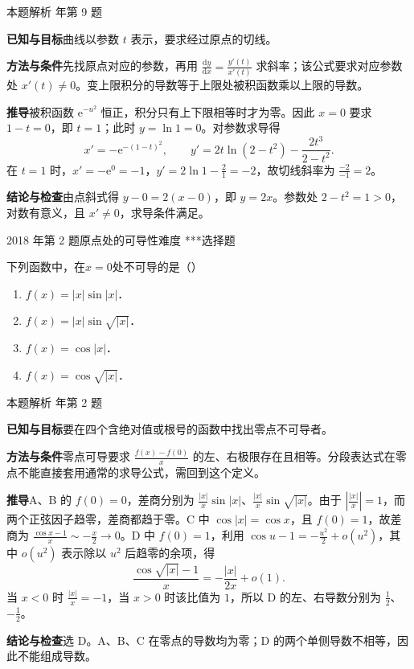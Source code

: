 \documentclass[UTF8,zihao=-4,fontset=fandol]{ctexart}
\newcommand{\pickout}{\hfill（\hspace{1.4em}）}
\newenvironment{abcd}{\begin{enumerate}[label=\textup{(\Alph*)},leftmargin=2.3em,itemsep=1pt,topsep=4pt,parsep=1pt]}{\end{enumerate}}
\newcounter{BankQuestion}
\newcommand{\QuestionPage}[7]{%
  \stepcounter{BankQuestion}%
  \par\noindent\begin{minipage}{\linewidth}
  \raggedright
  {\small\textcolor{black!60}{#3\quad #5\quad 难度 #7}\hfill\textcolor{accent}{#2}}\par\smallskip}
\newcommand{\QuestionEnd}{\end{minipage}\par\medskip}
\newcommand{\QuestionPage}[7]{%
  \clearpage
  \stepcounter{BankQuestion}%
  {\small\textcolor{accent}{#1\hfill #2}}\par\medskip
  {\small\textcolor{black!60}{#3\quad #5\quad 难度 #7\hfill \arabic{BankQuestion} / 234}}\par\vspace{9bp}}
\newcommand{\QuestionEnd}{}
\newenvironment{QuestionSolution}[1]{%
  \clearpage
  {\small\textcolor{black!60}{本题解析\quad #1}}\par\medskip
}{\par\clearpage}
\begin{document}
\begin{QuestionSolution}{2009 年第 9 题}
\textbf{已知与目标}\quad 曲线以参数 \(t\) 表示，要求经过原点的切线。

\textbf{方法与条件}\quad 先找原点对应的参数，再用 \(\frac{\mathrm dy}{\mathrm dx}=\frac{y'(t)}{x'(t)}\) 求斜率；该公式要求对应参数处 \(x'(t)\ne0\)。变上限积分的导数等于上限处被积函数乘以上限的导数。

\textbf{推导}\quad 被积函数 \(\mathrm e^{-u^2}\) 恒正，积分只有上下限相等时才为零。因此 \(x=0\) 要求 \(1-t=0\)，即 \(t=1\)；此时 \(y=\ln1=0\)。对参数求导得
\[
x'=-\mathrm{e}^{-(1-t)^2},\qquad
y'=2t\ln(2-t^2)-\frac{2t^3}{2-t^2}.
\]
在 \(t=1\) 时，\(x'=-\mathrm e^0=-1\)，\(y'=2\ln1-\frac{2}{1}=-2\)，故切线斜率为 \(\frac{-2}{-1}=2\)。

\textbf{结论与检查}\quad 由点斜式得 \(y-0=2(x-0)\)，即 \(\boxed{y=2x}\)。参数处 \(2-t^2=1>0\)，对数有意义，且 \(x'\ne0\)，求导条件满足。
\end{QuestionSolution}

\QuestionPage{2.1 导数的概念}{选择题}{2018 年第 2 题}{1}{原点处的可导性}{050 / 234}{***}
下列函数中，在$x = 0$处不可导的是\pickout{}
\begin{abcd}
\item $f(x) = |x|\sin |x|$．
\item $f(x) = |x|\sin \sqrt{|x|}$．
\item $f(x) = \cos |x|$．
\item $f(x) = \cos \sqrt{|x|}$．
\end{abcd}
\QuestionEnd

\begin{QuestionSolution}{2018 年第 2 题}
\textbf{已知与目标}\quad 要在四个含绝对值或根号的函数中找出零点不可导者。

\textbf{方法与条件}\quad 零点可导要求 \(\frac{f(x)-f(0)}{x}\) 的左、右极限存在且相等。分段表达式在零点不能直接套用通常的求导公式，需回到这个定义。

\textbf{推导}\quad A、B 的 \(f(0)=0\)，差商分别为 \(\frac{|x|}{x}\sin|x|\)、\(\frac{|x|}{x}\sin\sqrt{|x|}\)。由于 \(\left|\frac{|x|}{x}\right|=1\)，而两个正弦因子趋零，差商都趋于零。C 中 \(\cos|x|=\cos x\)，且 \(f(0)=1\)，故差商为 \(\frac{\cos x-1}{x}\sim-\frac{x}{2}\to0\)。D 中 \(f(0)=1\)，利用 \(\cos u-1=-\frac{u^2}{2}+o(u^2)\)，其中 \(o(u^2)\) 表示除以 \(u^2\) 后趋零的余项，得
\[
\frac{\cos\sqrt{|x|}-1}{x}=-\frac{|x|}{2x}+o(1).
\]
当 \(x<0\) 时 \(\frac{|x|}{x}=-1\)，当 \(x>0\) 时该比值为 \(1\)，所以 D 的左、右导数分别为 \(\frac{1}{2}\)、\(-\frac{1}{2}\)。

\textbf{结论与检查}\quad 选 \(\boxed{\mathrm D}\)。A、B、C 在零点的导数均为零；D 的两个单侧导数不相等，因此不能组成导数。
\end{QuestionSolution}
\end{document}
